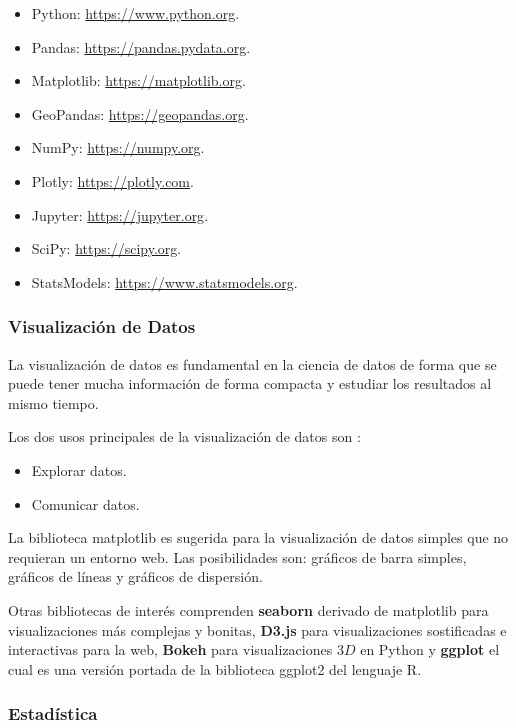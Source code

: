 \documentclass[conference]{IEEEtran}
\begin{document}
\begin{itemize}
    \item Python: \url{https://www.python.org}.
    \item Pandas: \url{https://pandas.pydata.org}.
    \item Matplotlib: \url{https://matplotlib.org}.
    \item GeoPandas: \url{https://geopandas.org}.
    \item NumPy: \url{https://numpy.org}.
    \item Plotly: \url{https://plotly.com}.
    \item Jupyter: \url{https://jupyter.org}.
    \item SciPy: \url{https://scipy.org}.
    \item StatsModels: \url{https://www.statsmodels.org}.
\end{itemize}

\subsubsection{Visualización de Datos}

La visualización de datos es fundamental en la ciencia de datos de forma que se puede tener mucha información de forma compacta y estudiar los resultados al mismo tiempo.

\bigbreak

Los dos usos principales de la visualización de datos son \cite{grus-2015}:

\begin{itemize}
    \item Explorar datos.
    \item Comunicar datos.
\end{itemize}

La biblioteca matplotlib es sugerida \cite{grus-2015} para la visualización de datos simples que no requieran un entorno web. Las posibilidades son: gráficos de barra simples, gráficos de líneas y gráficos de dispersión.

\bigbreak

Otras bibliotecas de interés comprenden \textbf{seaborn} derivado de matplotlib para visualizaciones más complejas y bonitas, \textbf{D3.js} para visualizaciones sostificadas e interactivas para la web, \textbf{Bokeh} para visualizaciones $3D$ en Python y \textbf{ggplot} el cual es una versión portada de la biblioteca ggplot2 del lenguaje R. 

\subsubsection{Estadística}
\end{document}
